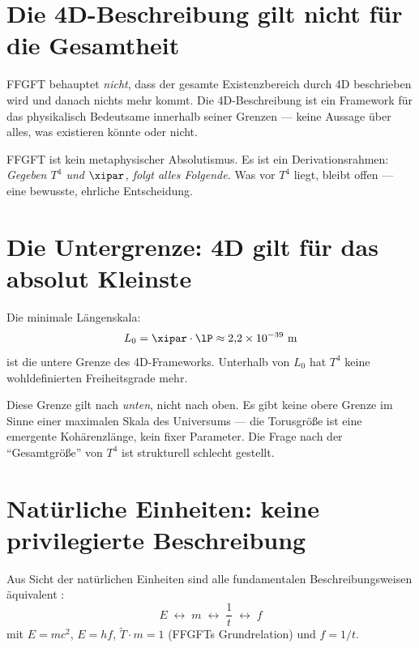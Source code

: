 \section{Die 4D-Beschreibung gilt nicht für die Gesamtheit}

FFGFT behauptet \emph{nicht}, dass der gesamte Existenzbereich durch 4D beschrieben wird und danach nichts mehr kommt. Die 4D-Beschreibung ist ein Framework für das physikalisch Bedeutsame innerhalb seiner Grenzen --- keine Aussage über alles, was existieren könnte oder nicht.

FFGFT ist kein metaphysischer Absolutismus. Es ist ein Derivationsrahmen: \emph{Gegeben $T^4$ und $\xipar$, folgt alles Folgende.} Was vor $T^4$ liegt, bleibt offen --- eine bewusste, ehrliche Entscheidung.

\section{Die Untergrenze: 4D gilt für das absolut Kleinste}

Die minimale Längenskala:
\begin{equation}
  L_0 = \xipar \cdot \lP \approx 2{,}2 \times 10^{-39} \text{ m}
\end{equation}
ist die untere Grenze des 4D-Frameworks. Unterhalb von $L_0$ hat $T^4$ keine wohldefinierten Freiheitsgrade mehr.

Diese Grenze gilt nach \emph{unten}, nicht nach oben. Es gibt keine obere Grenze im Sinne einer maximalen Skala des Universums --- die Torusgröße ist eine emergente Kohärenzlänge, kein fixer Parameter. Die Frage nach der ``Gesamtgröße'' von $T^4$ ist strukturell schlecht gestellt.

\section{Natürliche Einheiten: keine privilegierte Beschreibung}

Aus Sicht der natürlichen Einheiten sind alle fundamentalen Beschreibungsweisen äquivalent \cite{Pascher2026}:
\begin{equation}
  E \;\longleftrightarrow\; m \;\longleftrightarrow\; \frac{1}{t} \;\longleftrightarrow\; f
\end{equation}
mit $E = mc^2$, $E = hf$, $\tilde{T} \cdot m = 1$ (FFGFTs Grundrelation) und $f = 1/t$.


